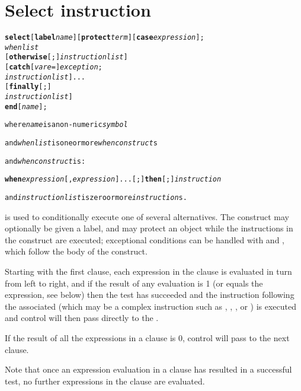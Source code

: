 \chapter{Select instruction}
\index{,}
\index{,}
\index{,}
\index{,}
\begin{shaded}
\begin{alltt}
\textbf{select} [\textbf{label} \emph{name}] [\textbf{protect} \emph{term}] [\textbf{case} \emph{expression}];
        \emph{whenlist}
        [\textbf{otherwise}[;] \emph{instructionlist}]
    [\textbf{catch} [\emph{vare} =] \emph{exception};
        \emph{instructionlist}]...
    [\textbf{finally}[;]
        \emph{instructionlist}]
    \textbf{end} [\emph{name}];

where \emph{name} is a non-numeric \emph{symbol}

and \emph{whenlist} is one or more \emph{whenconstruct}s

and \emph{whenconstruct} is:

    \textbf{when} \emph{expression}[, \emph{expression}]... [;] \textbf{then}[;] \emph{instruction}

and \emph{instructionlist} is zero or more \emph{instruction}s.
\end{alltt}
\end{shaded}
  is used to conditionally execute one of several
alternatives.
The construct may optionally be given a label, and may protect an object
while the instructions in the construct are executed; exceptional
conditions can be handled with  and ,
which follow the body of the construct.
 
Starting with the first  clause, each expression in
the clause is evaluated in turn from left to right, and if the
result of any evaluation is 1 (or equals the 
expression, see below) then the test has succeeded and the
instruction following the associated  (which may be
a complex instruction such as , ,
, or ) is executed and control will
then pass directly to the .
 
If the result of all the expressions in a  clause
is 0, control will pass to the next  clause.
 
Note that once an expression evaluation in a 
clause has resulted in a successful test, no further expressions
in the clause are evaluated.
 

